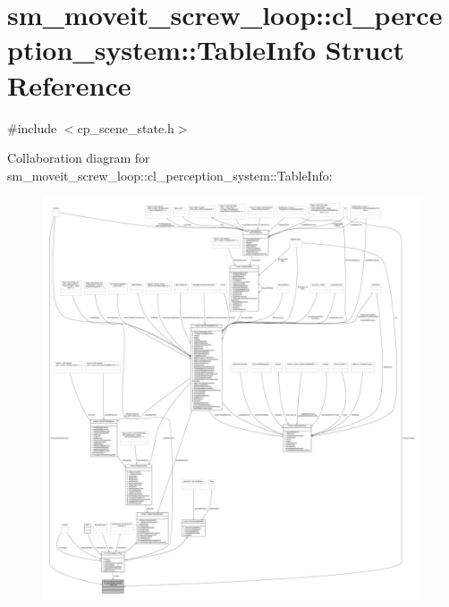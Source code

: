 \hypertarget{structsm__moveit__screw__loop_1_1cl__perception__system_1_1TableInfo}{}\section{sm\+\_\+moveit\+\_\+screw\+\_\+loop\+:\+:cl\+\_\+perception\+\_\+system\+:\+:Table\+Info Struct Reference}
\label{structsm__moveit__screw__loop_1_1cl__perception__system_1_1TableInfo}


{\ttfamily \#include $<$cp\+\_\+scene\+\_\+state.\+h$>$}



Collaboration diagram for sm\+\_\+moveit\+\_\+screw\+\_\+loop\+:\+:cl\+\_\+perception\+\_\+system\+:\+:Table\+Info\+:
\nopagebreak
\begin{figure}[H]
\begin{center}
\leavevmode
\includegraphics[width=350pt]{structsm__moveit__screw__loop_1_1cl__perception__system_1_1TableInfo__coll__graph}
\end{center}
\end{figure}
